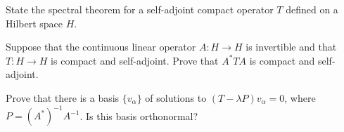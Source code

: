\begin{alist}
\item State the spectral theorem for a self-adjoint compact operator
$T$ defined on a Hilbert space $H$.
\item Suppose that the continuous linear operator $A:H\rightarrow H$
is invertible and that $T:H\rightarrow H$ is compact and self-adjoint.
Prove that $A^*TA$ is compact and self-adjoint.
\item Prove that there is a basis $\{v_{\alpha}\}$ of solutions to
$(T-\lambda P)v_{\alpha}=0$, where $P=(A^*)^{-1}A^{-1}$. Is this basis
orthonormal?
\end{alist}
